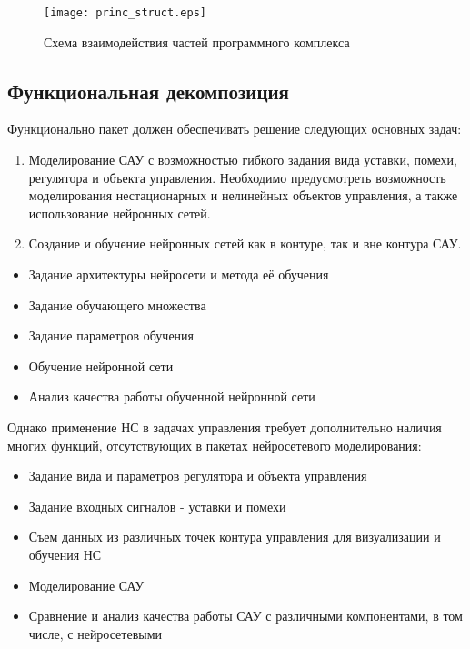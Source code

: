 \begin{figure}
\centerline{\texttt{[image: princ\_struct.eps]}}
\caption{Схема взаимодействия частей программного комплекса}
\label{fig:prog_interaction_struct}
\end{figure}

\subsection{Функциональная декомпозиция}

Функционально пакет должен обеспечивать решение следующих основных
задач:
\begin{enumerate}
\item Моделирование САУ с возможностью гибкого задания вида уставки,
  помехи, регулятора и объекта управления.  Необходимо предусмотреть
  возможность моделирования нестационарных и нелинейных объектов
  управления, а также использование нейронных сетей.
\item Создание и обучение нейронных сетей как в контуре, так и вне
  контура САУ.
\end{enumerate}

\begin{itemize}
\item Задание архитектуры нейросети и метода её обучения
\item Задание обучающего множества
\item Задание параметров обучения
\item Обучение нейронной сети
\item Анализ качества работы обученной нейронной сети
\end{itemize}

Однако применение НС в задачах управления требует дополнительно
наличия многих функций, отсутствующих в пакетах нейросетевого
моделирования:

\begin{itemize}
\item Задание вида и параметров регулятора и объекта управления
\item Задание входных сигналов - уставки и помехи
\item Съем данных из различных точек контура управления для
  визуализации и обучения НС
\item Моделирование САУ
\item Сравнение и анализ качества работы САУ с различными
  компонентами, в том числе, с нейросетевыми
\end{itemize}


